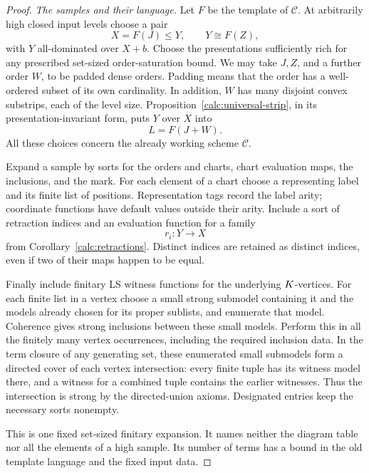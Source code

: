 \begin{proof}
\par\medskip\noindent\textit{The samples and their language.}\quad
Let \(F\) be the template of \(\mathcal C\).  At arbitrarily high
closed input levels choose a pair
\[
       X=F(J)\leq Y,\qquad Y\cong F(Z),
\]
with \(Y\) all-dominated over \(X+b\).
Choose the presentations sufficiently rich for any prescribed
set-sized order-saturation bound.  We may take \(J,Z\), and a further
order \(W\), to be padded dense orders.  Padding means that the
order has a well-ordered subset of its own cardinality.  In addition,
\(W\) has many disjoint convex substrips, each of the level size.
Proposition~\ref{calc:universal-strip}, in its presentation-invariant
form, puts \(Y\) over \(X\) into
\[
                         L=F(J+W).
\]
All these choices concern the already working scheme \(\mathcal C\).

Expand a sample by sorts for the orders and charts, chart
evaluation maps, the inclusions, and the mark.  For each element of a
chart choose a representing label and its finite list of positions.
Representation tags record the label arity; coordinate functions
have default values outside their arity.  Include a sort of
retraction indices and an evaluation function for a family
\[
                         r_i:Y\longrightarrow X
\]
from Corollary~\ref{calc:retractions}.  Distinct indices are retained as
distinct indices, even if two of their maps happen to be equal.

Finally include finitary LS witness functions for the underlying
\(K\)-vertices.  For each finite list in a vertex choose a small
strong submodel containing it and the models already chosen for
its proper sublists, and enumerate that model.  Coherence gives
strong inclusions between these small models.  Perform this in all
the finitely many vertex occurrences, including the required
inclusion data.  In the term closure of any generating set, these
enumerated small submodels form a directed cover of each vertex
intersection: every finite tuple has its witness model there,
and a witness for a combined tuple contains the earlier witnesses.
Thus the intersection is strong by the directed-union axioms.
Designated entries keep the necessary sorts nonempty.

This is one fixed set-sized finitary expansion.  It names neither
the diagram table nor all the elements of a high sample.  Its
number of terms has a bound in the old template language and the
fixed input data.


\end{proof}
